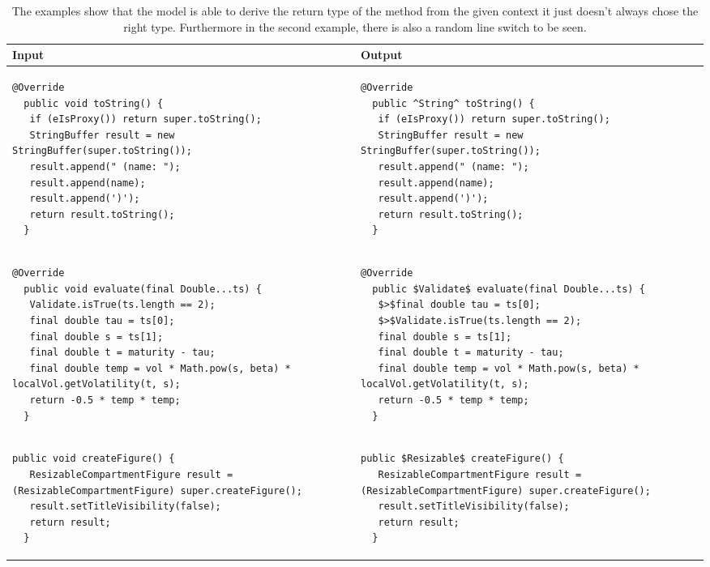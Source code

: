 \begin{landscape}
\begin{table}[p]
\begin{tabular}{ | m{10cm} | m{10cm} | }
  \hline
  Input & Output \\
  \hline
  {\begin{lstlisting}[style=table]
  @Override
  public void toString() {
   if (eIsProxy()) return super.toString();
   StringBuffer result = new StringBuffer(super.toString());
   result.append(" (name: ");
   result.append(name);
   result.append(')');
   return result.toString();
  }
  \end{lstlisting}} &
  {\begin{lstlisting}[style=table]
  @Override
  public ^String^ toString() {
   if (eIsProxy()) return super.toString();
   StringBuffer result = new StringBuffer(super.toString());
   result.append(" (name: ");
   result.append(name);
   result.append(')');
   return result.toString();
  }
  \end{lstlisting}} \\
  \hline
  {\begin{lstlisting}[style=table]
  @Override
  public void evaluate(final Double...ts) {
   Validate.isTrue(ts.length == 2);
   final double tau = ts[0];
   final double s = ts[1];
   final double t = maturity - tau;
   final double temp = vol * Math.pow(s, beta) * localVol.getVolatility(t, s);
   return -0.5 * temp * temp;
  }
  \end{lstlisting}} &
  {\begin{lstlisting}[style=table]
  @Override
  public $Validate$ evaluate(final Double...ts) {
   $>$final double tau = ts[0];
   $>$Validate.isTrue(ts.length == 2);
   final double s = ts[1];
   final double t = maturity - tau;
   final double temp = vol * Math.pow(s, beta) * localVol.getVolatility(t, s);
   return -0.5 * temp * temp;
  }
  \end{lstlisting}} \\
  \hline
  {\begin{lstlisting}[style=table]
  public void createFigure() {
   ResizableCompartmentFigure result = (ResizableCompartmentFigure) super.createFigure();
   result.setTitleVisibility(false);
   return result;
  }
  \end{lstlisting}} &
  {\begin{lstlisting}[style=table]
  public $Resizable$ createFigure() {
   ResizableCompartmentFigure result = (ResizableCompartmentFigure) super.createFigure();
   result.setTitleVisibility(false);
   return result;
  }
  \end{lstlisting}} \\
  \hline
\end{tabular}
\caption{The examples show that the model is able to derive the return type of the method from the given context it just doesn't always chose the right type. Furthermore in the second example, there is also a random line switch to be seen.}
\label{return_type_showcase_table}
\end{table}


\end{landscape}
